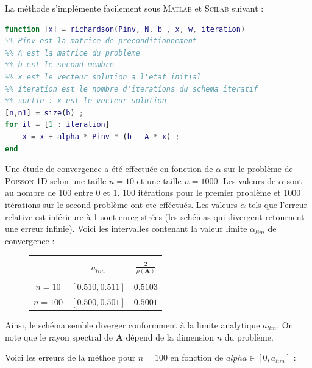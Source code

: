 \documentclass[12pt]{report}
\newcommand{\A}{\mathbf{A}}
\begin{document}
La méthode s'implémente facilement sous \textsc{Matlab} et \textsc{Scilab} suivant : 
\begin{lstlisting}[language=Matlab, caption=Richardson]
function [x] = richardson(Pinv, N, b , x, w, iteration)
%% Pinv est la matrice de preconditionnement
%% A est la matrice du probleme
%% b est le second membre
%% x est le vecteur solution a l'etat initial
%% iteration est le nombre d'iterations du schema iteratif
%% sortie : x est le vecteur solution
[n,n1] = size(b) ;
for it = [1 : iteration]
    x = x + alpha * Pinv * (b - A * x) ; 
end
\end{lstlisting}


Une étude de convergence a été effectuée en fonction de $\alpha$ sur le problème de \textsc{Poisson} 1D selon une taille $n = 10$ et une taille $n = 1000$. Les valeurs de $\alpha$ sont au nombre de 100 entre 0 et 1. 100 itérations pour le premier problème et 1000 itérations sur le second problème ont ete efféctués. Les valeurs $\alpha$ tels que l'erreur relative est inférieure à 1 sont enregistrées (les schémas qui divergent retournent une erreur infinie).  Voici les intervalles contenant la valeur limite $\alpha_{lim}$ de convergence :

\begin{figure}[H]
\centering
\begin{tabular}{|c|c|c|}
\hline
&&\\
~ & $a_{lim}$& $\frac{2}{\rho(\A)}$ \\ 
&&\\\hline
$n = 10$  & $[0.510 , 0.511] $ &$0.5103$\\ \hline
$n=100$ & $[0.500 , 0.501]$ & $0.5001$\\ \hline
\end{tabular}
\end{figure}

Ainsi, le schéma semble diverger conformment à la limite analytique $a_{lim}$. On note que le rayon spectral de $\A$ dépend de la dimension $n$ du problème.

Voici les erreurs de la méthoe pour $n = 100$ en fonction de $alpha \in [0 , a_{lim}]$ : 
\end{document}

